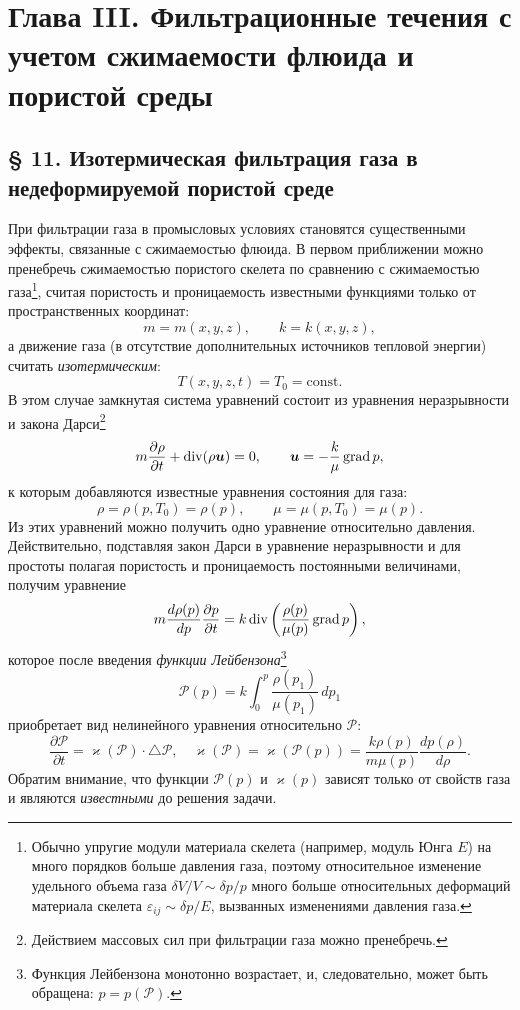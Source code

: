 \section*{Глава III. Фильтрационные течения с учетом сжимаемости флюида и пористой среды}
\subsection*{§ 11. Изотермическая фильтрация газа в недеформируемой пористой среде}
\setcounter{footnote}{0}
При фильтрации газа в промысловых условиях становятся существенными эффекты, связанные с сжимаемостью флюида. В первом приближении можно пренебречь сжимаемостью пористого скелета по сравнению с сжимаемостью газа\footnote{Обычно упругие модули материала скелета (например, модуль Юнга $E$) на много порядков больше давления газа, поэтому относительное изменение удельного объема газа $\delta V/V\sim\delta p/p$ много больше относительных деформаций материала скелета $\varepsilon_{ij}\sim\delta p/E$, вызванных изменениями давления газа.}, считая пористость и проницаемость известными функциями только от пространственных координат:
\[m=m(x,y,z),\qquad k=k(x,y,z),\]
а движение газа (в отсутствие дополнительных источников тепловой энергии) считать \textit{изотермическим}:
\[T(x,y,z,t)=T_0=\mathrm{const}.\]
В этом случае замкнутая система уравнений состоит из уравнения неразрывности и закона Дарси\footnote{Действием массовых сил при фильтрации газа можно пренебречь.}
\[m\frac{\partial\rho}{\partial t}+\operatorname{div}(\rho\boldsymbol{u})=0,\qquad\boldsymbol{u}=-\frac{k}{\mu}\operatorname{grad} p,\]
к которым добавляются известные уравнения состояния для газа:
\[\rho=\rho(p,T_0)=\rho(p),\qquad\mu=\mu(p,T_0)=\mu(p).\]
Из этих уравнений можно получить одно уравнение относительно давления. Действительно, подставляя закон Дарси в уравнение неразрывности и для простоты полагая пористость и проницаемость постоянными величинами, получим уравнение
\[m\frac{d\rho(p)}{dp}\frac{\partial p}{\partial t}=k\operatorname{div}\left(\frac{\rho(p)}{\mu(p)}\operatorname{grad} p\right),\]
которое после введения \textit{функции Лейбензона}\setcounter{footnote}{0}\footnote{Функция Лейбензона монотонно возрастает, и, следовательно, может быть обращена: $p=p(\mathscr{P})$.}
\[\mathscr{P}(p)=k\int_0^p\frac{\rho(p_1)}{\mu(p_1)}\,dp_1\]
приобретает вид нелинейного уравнения относительно $\mathscr{P}$:
\[\frac{\partial\mathscr{P}}{\partial t}=\varkappa(\mathscr{P})\cdot\triangle\mathscr{P},\quad\varkappa(\mathscr{P})=\varkappa(\mathscr{P}(p))=\frac{k\rho(p)}{m\mu(p)}\frac{dp(\rho)}{d\rho}.\]
Обратим внимание, что функции $\mathscr{P}(p)$ и $\varkappa(p)$ зависят только от свойств газа и являются \textit{известными} до решения задачи.

